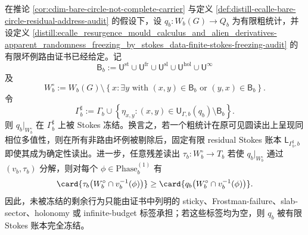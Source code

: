 \begin{theorem}\label{distill:ecalle_resurgence_mould_calculus_and_alien_derivatives-apparent_randomness_freezing_by_stokes_data-conditional-finite-stokes-freezing-routing}
在推论 \ref{cor:cdim-bare-circle-not-complete-carrier} 与定义 \ref{def:distill-ecalle-bare-circle-residual-address-audit} 的假设下，设 \(q_b:W_b(G)\to Q_b\) 为有限粗统计，并设定义 \ref{distill:ecalle_resurgence_mould_calculus_and_alien_derivatives-apparent_randomness_freezing_by_stokes_data-finite-stokes-freezing-audit} 的有限坏例路由证书已经给定。记
\[
\mathsf B_b:=
\mathsf U^{\mathrm{st}}\cup\mathsf U^{\mathrm{fr}}\cup\mathsf U^{\mathrm{sl}}\cup\mathsf U^{\mathrm{hol}}\cup\mathsf U^{\infty}
\]
及
\[
W_b^{\circ}:=
W_b(G)\setminus
\left\{x:\exists y\text{ with }(x,y)\in\mathsf B_b\text{ or }(y,x)\in\mathsf B_b\right\}.
\]
令
\[
\Gamma_b^{\sharp}:=\Gamma_b\cup
\left\{\eta_{x,y}:(x,y)\in\mathsf U_{\Gamma,b}(q_b)\setminus\mathsf B_b\right\}.
\]
则 \(q_b|_{W_b^{\circ}}\) 在 \(\Gamma_b^{\sharp}\) 上被 Stokes 冻结。换言之，若一个粗统计在原可见圆读出上呈现同相位多值性，则在所有非路由坏例被剔除后，固定有限 residual Stokes 账本
\(\mathsf L_{\Gamma_b^{\sharp},b}\) 即使其成为确定性读出。进一步，任意残差读出
\(\tau_b:W_b^{\circ}\to T_b\)
若使 \(q_b|_{W_b^{\circ}}\) 通过 \((v_b,\tau_b)\) 分解，则对每个 \(\phi\in\mathrm{Phase}_b^{(1)}\) 有
\[
\card{\tau_b\bigl(W_b^{\circ}\cap v_b^{-1}(\phi)\bigr)}
\ge
\card{q_b\bigl(W_b^{\circ}\cap v_b^{-1}(\phi)\bigr)}.
\]
因此，未被冻结的剩余行为只能由证书中列明的 sticky、Frostman-failure、slab-sector、holonomy 或 infinite-budget 标签承担；若这些标签均为空，则 \(q_b\) 被有限 Stokes 账本完全冻结。
\end{theorem}
